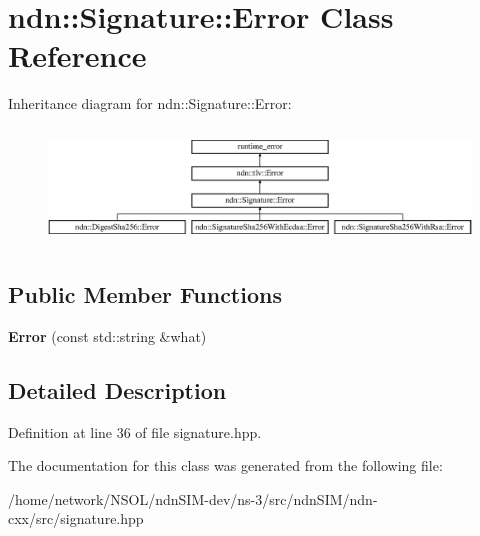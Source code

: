 \hypertarget{classndn_1_1Signature_1_1Error}{}\section{ndn\+:\+:Signature\+:\+:Error Class Reference}
\label{classndn_1_1Signature_1_1Error}
Inheritance diagram for ndn\+:\+:Signature\+:\+:Error\+:\begin{figure}[H]
\begin{center}
\leavevmode
\includegraphics[height=3.124128cm]{classndn_1_1Signature_1_1Error}
\end{center}
\end{figure}
\subsection*{Public Member Functions}
\begin{DoxyCompactItemize}
\item 
{\bfseries Error} (const std\+::string \&what)\hypertarget{classndn_1_1Signature_1_1Error_a89dc4bc7f1ccfbb5a6c079f00ea222ce}{}\label{classndn_1_1Signature_1_1Error_a89dc4bc7f1ccfbb5a6c079f00ea222ce}

\end{DoxyCompactItemize}


\subsection{Detailed Description}


Definition at line 36 of file signature.\+hpp.



The documentation for this class was generated from the following file\+:\begin{DoxyCompactItemize}
\item 
/home/network/\+N\+S\+O\+L/ndn\+S\+I\+M-\/dev/ns-\/3/src/ndn\+S\+I\+M/ndn-\/cxx/src/signature.\+hpp\end{DoxyCompactItemize}
